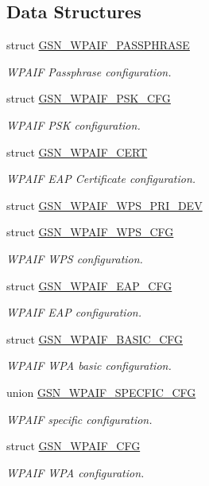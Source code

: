 \subsection*{Data Structures}
\begin{DoxyCompactItemize}
\item 
struct \hyperlink{a00424}{GSN\_\-WPAIF\_\-PASSPHRASE}
\begin{DoxyCompactList}\small\item\em WPAIF Passphrase configuration. \end{DoxyCompactList}\item 
struct \hyperlink{a00425}{GSN\_\-WPAIF\_\-PSK\_\-CFG}
\begin{DoxyCompactList}\small\item\em WPAIF PSK configuration. \end{DoxyCompactList}\item 
struct \hyperlink{a00421}{GSN\_\-WPAIF\_\-CERT}
\begin{DoxyCompactList}\small\item\em WPAIF EAP Certificate configuration. \end{DoxyCompactList}\item 
struct \hyperlink{a00428}{GSN\_\-WPAIF\_\-WPS\_\-PRI\_\-DEV}
\item 
struct \hyperlink{a00427}{GSN\_\-WPAIF\_\-WPS\_\-CFG}
\begin{DoxyCompactList}\small\item\em WPAIF WPS configuration. \end{DoxyCompactList}\item 
struct \hyperlink{a00423}{GSN\_\-WPAIF\_\-EAP\_\-CFG}
\begin{DoxyCompactList}\small\item\em WPAIF EAP configuration. \end{DoxyCompactList}\item 
struct \hyperlink{a00420}{GSN\_\-WPAIF\_\-BASIC\_\-CFG}
\begin{DoxyCompactList}\small\item\em WPAIF WPA basic configuration. \end{DoxyCompactList}\item 
union \hyperlink{a00426}{GSN\_\-WPAIF\_\-SPECFIC\_\-CFG}
\begin{DoxyCompactList}\small\item\em WPAIF specific configuration. \end{DoxyCompactList}\item 
struct \hyperlink{a00422}{GSN\_\-WPAIF\_\-CFG}
\begin{DoxyCompactList}\small\item\em WPAIF WPA configuration. \end{DoxyCompactList}\end{DoxyCompactItemize}
